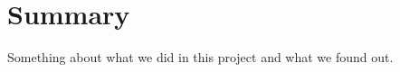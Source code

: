 
\clearpage

\section{Summary}\label{summary}

Something about what we did in this project and what we found out.


